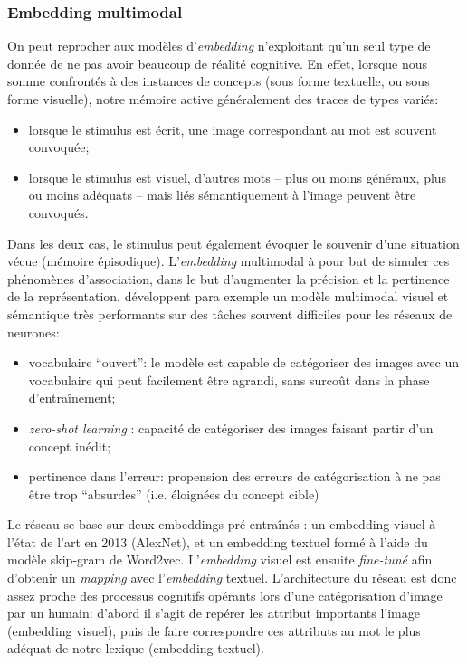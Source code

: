 \documentclass[french]{article}
\begin{document}
			\subsubsection{Embedding multimodal}
				On peut reprocher aux modèles d'\textit{embedding} n'exploitant qu'un seul type de donnée de ne pas avoir beaucoup de réalité cognitive. En effet, lorsque nous somme confrontés à des instances de concepts (sous forme textuelle, ou sous forme visuelle), notre mémoire active généralement des traces de types variés:
				\begin{itemize}
					\item lorsque le stimulus est écrit, une image correspondant au mot est souvent convoquée;
					\item lorsque le stimulus est visuel, d'autres mots -- plus ou moins généraux, plus ou moins adéquats -- mais liés sémantiquement à l'image peuvent être convoqués.
				\end{itemize}
				Dans les deux cas, le stimulus peut également évoquer le souvenir d'une situation vécue (mémoire épisodique). L'\textit{embedding} multimodal à pour but de simuler ces phénomènes d'association, dans le but d'augmenter la précision et la pertinence de la représentation. \cite{frome2013} développent para exemple un modèle multimodal visuel et sémantique très performants sur des tâches souvent difficiles pour les réseaux de neurones:
				\begin{itemize}
					\item vocabulaire ``ouvert'': le modèle est capable de catégoriser des images avec un vocabulaire qui peut facilement être agrandi, sans surcoût dans la phase d'entraînement;
					\item \textit{zero-shot learning} : capacité de catégoriser des images faisant partir d'un concept inédit;
					\item pertinence dans l'erreur: propension des erreurs de catégorisation à ne pas être trop ``absurdes'' (i.e. éloignées du concept cible)  
				\end{itemize}
				Le réseau se base sur deux embeddings pré-entraînés : un embedding visuel à l'état de l'art en 2013 (AlexNet), et un embedding textuel formé à l'aide du modèle skip-gram de Word2vec. L'\textit{embedding} visuel est ensuite \textit{fine-tuné} afin d'obtenir un \textit{mapping} avec l'\textit{embedding} textuel. L'architecture du réseau est donc assez proche des processus cognitifs opérants lors d'une catégorisation d'image par un humain: d'abord il s'agit de repérer les attribut importants l'image (embedding visuel), puis de faire correspondre ces attributs au mot le plus adéquat de notre lexique (embedding textuel). \\
\end{document}
